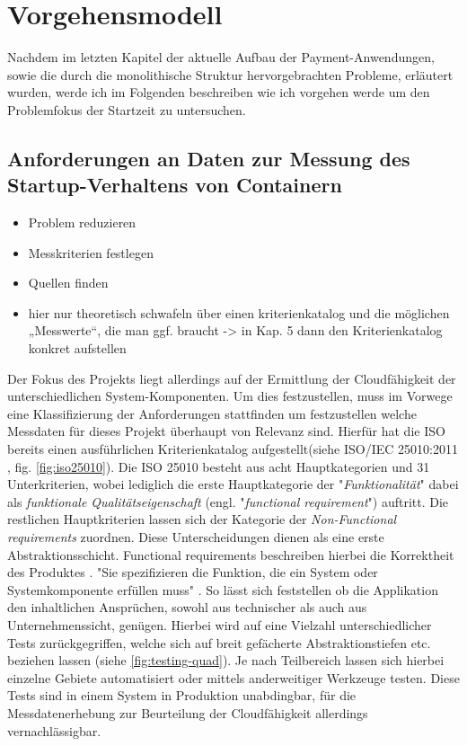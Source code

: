 \chapter{Vorgehensmodell}

Nachdem im letzten Kapitel der aktuelle Aufbau der Payment-Anwendungen, sowie die durch die monolithische Struktur hervorgebrachten Probleme, erläutert wurden, werde ich im Folgenden beschreiben wie ich vorgehen werde um den Problemfokus der Startzeit zu untersuchen.

\section{Anforderungen an Daten zur Messung des Startup-Verhaltens von Containern}
\begin{itemize}
  \item Problem reduzieren
  \item Messkriterien festlegen
  \item Quellen finden
  \item hier nur theoretisch schwafeln über einen kriterienkatalog und die möglichen „Messwerte“, die man ggf. braucht -> in Kap. 5 dann den Kriterienkatalog konkret aufstellen
\end{itemize}

Der Fokus des Projekts liegt allerdings auf der Ermittlung der Cloudfähigkeit der unterschiedlichen System-Komponenten. Um dies festzustellen, muss im Vorwege eine Klassifizierung der Anforderungen stattfinden um festzustellen welche Messdaten für dieses Projekt überhaupt von Relevanz sind. Hierfür hat die ISO bereits einen ausführlichen Kriterienkatalog aufgestellt(siehe ISO/IEC 25010:2011 \cite{iso25010}, fig. \ref{fig:iso25010}). Die ISO 25010 besteht aus acht Hauptkategorien und 31 Unterkriterien, wobei lediglich die erste Hauptkategorie der "\emph{Funktionalität}" dabei als \emph{funktionale Qualitätseigenschaft} (engl. "\emph{functional requirement}") auftritt. Die restlichen Hauptkriterien lassen sich der Kategorie der \emph{Non-Functional requirements} zuordnen. Diese Unterscheidungen dienen als eine erste Abstraktionsschicht. Functional requirements beschreiben hierbei die Korrektheit des Produktes \cite{continuous-delivery}. "Sie spezifizieren die Funktion, die ein System oder Systemkomponente erfüllen muss" \cite{eide-requirements}. So lässt sich feststellen ob die Applikation den inhaltlichen Ansprüchen, sowohl aus technischer als auch aus Unternehmenssicht, genügen. Hierbei wird auf eine Vielzahl unterschiedlicher Tests zurückgegriffen, welche sich auf breit gefächerte Abstraktionstiefen etc. beziehen lassen (siehe \ref{fig:testing-quad}). Je nach Teilbereich lassen sich hierbei einzelne Gebiete automatisiert oder mittels anderweitiger Werkzeuge testen. Diese Tests sind in einem System in Produktion unabdingbar, für die Messdatenerhebung zur Beurteilung der Cloudfähigkeit allerdings vernachlässigbar. 

